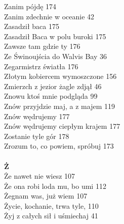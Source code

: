 \documentclass[a5paper, 10pt]{book}
\begin{document}
{\begin{multicols}{3}
    Zanim pójdę 174\\
    Zanim zdechnie w oceanie 42\\
    Zasadził baca 175\\
    Zasadził Baca w polu buroki 175\\
    Zawsze tam gdzie ty 176\\
    Ze Świnoujścia do Walvis Bay 36\\
    Zegarmistrz światła 176\\
    Złotym kobiercem wymoszczone 156\\
    Zmierzch z jezior żagle zdjął 46\\
    Znowu ktoś mnie podgląda 99\\
    Znów przyjdzie maj, a z majem 119\\
    Znów wędrujemy 177\\
    Znów wędrujemy ciepłym krajem 177\\
    Zostanie tyle gór 178\\
    Zrozum to, co powiem, spróbuj 173\\
    \\
    {\footnotesize \textbf{Ż\\} }
    Że nawet nie wiesz 107\\
    Że ona robi loda mu, bo umi 112\\
    Żegnam was, już wiem 107\\
    Życie, kochanie, trwa tyle, 110\\
    Żyj z całych sił i uśmiechaj 41\\
    
  \end{multicols}
}
\end{document}
